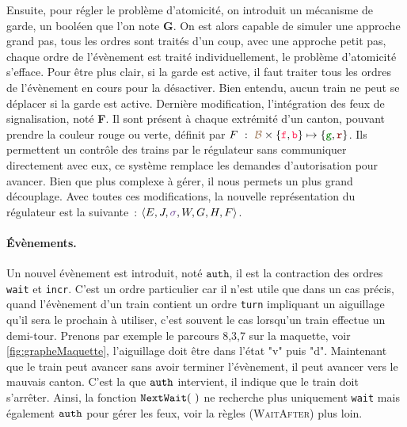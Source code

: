 \documentclass[oneside, a4paper, 11pt]{book}
\newcommand{\ruleFmt}[1]{\textsc{(#1)}}
\newcommand{\ruleDef}[1]{\hypertarget{#1}{\ruleFmt{#1}}}
\newcommand{\forward}{\ensuremath{\mathtt{f}}}
\newcommand{\backward}{\ensuremath{\mathtt{b}}}
\newcommand{\dirFmt}[1]{{\color{dircolor} #1}}
\newcommand{\dirForward}{\ensuremath{\dirFmt{\forward}}}
\newcommand{\dirBackward}{\ensuremath{\dirFmt{\backward}}}
\newcommand{\posFmt}[1]{{\color{poscolor}{#1}}}
\newcommand{\authOrder}{{\mbox{\ensuremath{\mathtt{auth}}}}}
\newcommand{\swFmt}[1]{{\color{swcolor}{#1}}}
\newcommand{\sigred}{{\mbox{${\color{red!50!black}\mathtt{r}}$}}}
\newcommand{\siggreen}{{\mbox{${\color{green!50!black}\mathtt{g}}$}}}
\newcommand{\nextWait}[1]{\ensuremath{{\tt NextWait}(#1)}}
\newcommand{\regM}[7]{\langle #1, #2, #3, #4, #5, #6, #7 \rangle}
\begin{document}
\noindent
Ensuite, pour régler le problème d'atomicité, on introduit un mécanisme de garde, un booléen que l'on note \textbf{G}. On est alors capable de simuler une approche grand pas, tous les ordres sont traités d'un coup, avec une approche petit pas, chaque ordre de l'évènement est traité individuellement, le problème d'atomicité s'efface.
Pour être plus clair, si la garde est active, il faut traiter tous les ordres de l'évènement en cours pour la désactiver. Bien entendu, aucun train ne peut se déplacer si la garde est active.
Dernière modification, l'intégration des feux de signalisation, noté \textbf{F}. Il sont présent à chaque extrémité d'un canton, pouvant prendre la couleur rouge ou verte, définit par $F~:~\posFmt{\mathcal{B}} \times \{\dirForward,\dirBackward\} \mapsto \{\siggreen, \sigred\}$. Ils permettent un contrôle des trains par le régulateur sans communiquer directement avec eux, ce système remplace les demandes d'autorisation pour avancer. Bien que plus complexe à gérer, il nous permets un plus grand découplage.
Avec toutes ces modifications, la nouvelle représentation du régulateur est la suivante~: $\regM{E}{J}{\swFmt{\sigma}}{W}{G}{H}{F}$.


\paragraph{Évènements.}
Un nouvel évènement est introduit, noté \authOrder, il est la contraction des ordres \texttt{wait} et \texttt{incr}. C'est un ordre particulier car il n'est utile que dans un cas précis, quand l'évènement d'un train contient un ordre \texttt{turn} impliquant un aiguillage qu'il sera le prochain à utiliser, c'est souvent le cas lorsqu'un train effectue un demi-tour. Prenons par exemple le parcours 8,3,7 sur la maquette, voir \ref{fig:grapheMaquette}, l'aiguillage doit être dans l'état "v" puis "d".
Maintenant que le train peut avancer sans avoir terminer l'évènement, il peut avancer vers le mauvais canton. C'est la que $\authOrder$ intervient, il indique que le train doit s'arrêter. Ainsi, la fonction \nextWait{~} ne recherche plus uniquement \texttt{wait} mais également $\authOrder$ pour gérer les feux, voir la règles \ruleDef{WaitAfter} plus loin.
\end{document}
